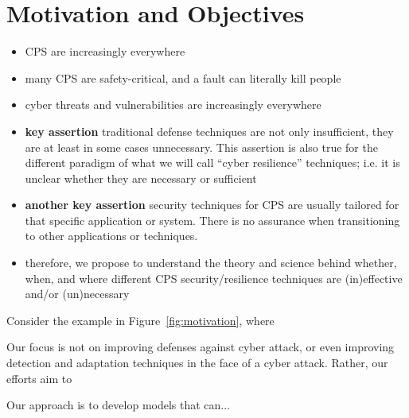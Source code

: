
\section{Motivation and Objectives}

\begin{itemize}
    \item CPS are increasingly everywhere
    \item many CPS are safety-critical, and a fault can literally kill people
    \item cyber threats and vulnerabilities are increasingly everywhere
    \item {\bf key assertion} traditional defense techniques are not only insufficient, they are at least in some cases unnecessary. This assertion is also true for the different paradigm of what we will call ``cyber resilience'' techniques; i.e. it is unclear whether they are necessary or sufficient
    \item {\bf another key assertion} security techniques for CPS are usually tailored for that specific application or system. There is no assurance when transitioning to other applications or techniques.
    \item therefore, we propose to understand the theory and science behind whether, when, and where different CPS security/resilience techniques are (in)effective and/or (un)necessary
\end{itemize}


Consider the example in Figure~\ref{fig:motivation}, where

\begin{figure}
\end{figure}

Our focus is not on improving defenses against cyber attack, or even improving detection and adaptation techniques in the face of a cyber attack. Rather, our efforts aim to


Our approach is to develop models that can...
\begin{figure}
\end{figure}